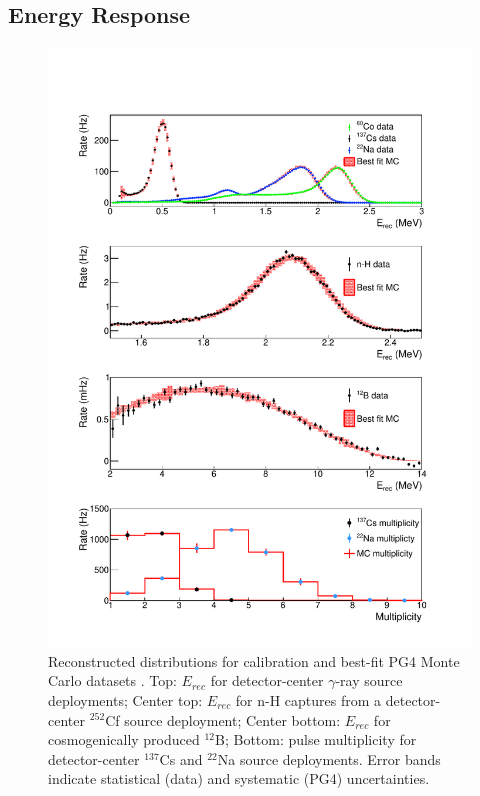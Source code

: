 \subsection{Energy Response}




\begin{figure}[h]
	\centering
	\includegraphics[width=0.7\linewidth]{tex/5-analysis-images/GammaE}
	\caption[]{Reconstructed distributions for calibration and best-fit PG4 Monte Carlo datasets \cite{XZhang:2815}. Top: $E_{rec}$ for detector-center $\gamma$-ray source deployments; Center top: $E_{rec}$ for n-H captures from a detector-center $^{252}$Cf source deployment; Center bottom: $E_{rec}$ for cosmogenically produced $^{12}$B; Bottom: pulse multiplicity for detector-center $^{137}$Cs and $^{22}$Na source deployments. Error bands indicate statistical (data) and systematic (PG4) uncertainties.}
	\label{fig:gammae}
\end{figure}

